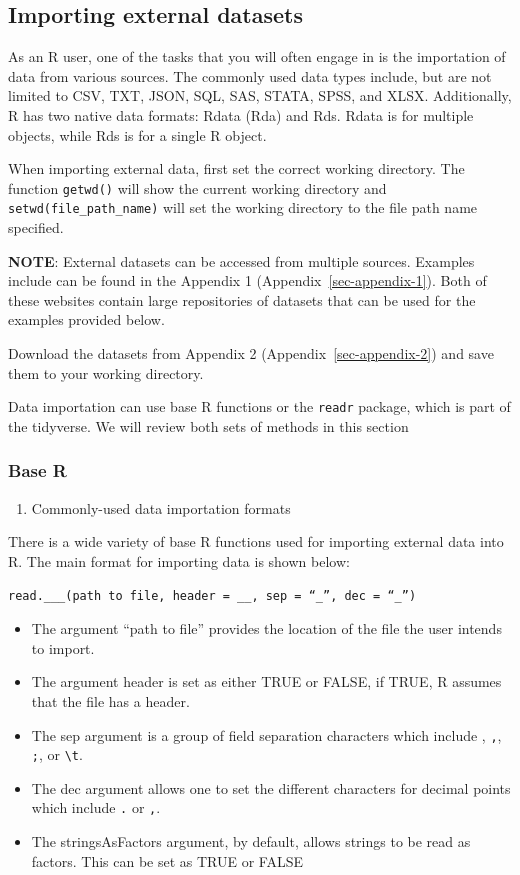 \documentclass[
  letterpaper,
  DIV=11,
  numbers=noendperiod]{scrreprt}
\providecommand{\tightlist}{%
  \setlength{\itemsep}{0pt}\setlength{\parskip}{0pt}}\usepackage{longtable,booktabs,array}
\begin{document}
\subsection{Importing external
datasets}\label{importing-external-datasets}

As an R user, one of the tasks that you will often engage in is the
importation of data from various sources. The commonly used data types
include, but are not limited to CSV, TXT, JSON, SQL, SAS, STATA, SPSS,
and XLSX. Additionally, R has two native data formats: Rdata (Rda) and
Rds. Rdata is for multiple objects, while Rds is for a single R object.

When importing external data, first set the correct working directory.
The function \texttt{getwd()} will show the current working directory
and \texttt{setwd(file\_path\_name)} will set the working directory to
the file path name specified.

\textbf{NOTE}: External datasets can be accessed from multiple sources.
Examples include can be found in the Appendix 1
(Appendix~\ref{sec-appendix-1}). Both of these websites contain large
repositories of datasets that can be used for the examples provided
below.

Download the datasets from Appendix 2 (Appendix~\ref{sec-appendix-2})
and save them to your working directory.

Data importation can use base R functions or the \texttt{readr} package,
which is part of the tidyverse. We will review both sets of methods in
this section

\subsubsection{Base R}\label{base-r}

\begin{enumerate}
\def\labelenumi{\arabic{enumi}.}
\tightlist
\item
  Commonly-used data importation formats
\end{enumerate}

There is a wide variety of base R functions used for importing external
data into R. The main format for importing data is shown below:

\texttt{read.\_\_\_(path\ to\ file,\ header\ =\ \_\_,\ sep\ =\ “\_”,\ dec\ =\ “\_”)}

\begin{itemize}
\item
  The argument ``path to file'' provides the location of the file the
  user intends to import.
\item
  The argument header is set as either TRUE or FALSE, if TRUE, R assumes
  that the file has a header.
\item
  The sep argument is a group of field separation characters which
  include , \texttt{,}, \texttt{;}, or \texttt{\textbackslash{}t}.
\item
  The dec argument allows one to set the different characters for
  decimal points which include \texttt{.} or \texttt{,}.
\item
  The stringsAsFactors argument, by default, allows strings to be read
  as factors. This can be set as TRUE or FALSE
\end{itemize}
\end{document}
